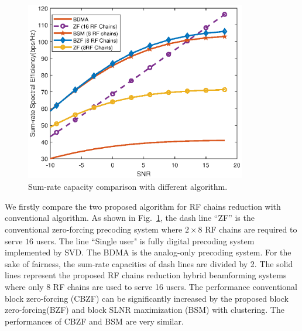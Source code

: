 \documentclass[conference]{IEEEtran}
\begin{document}
{\begin{figure}[ht]
	\begin{center}
		\includegraphics[width=3.8in,height=3.1in]{Figure/comp1path.eps}
		\caption{Sum-rate capacity comparison with different algorithm.}\label{fig:MultiuserGain}
	\end{center}
\end{figure}


We firstly compare the two proposed algorithm for RF chains reduction with conventional algorithm. As shown in Fig.~\ref{fig:MultiuserGain}, the dash line ``ZF'' is the conventional zero-forcing precoding system where $2\times 8$ RF chains are required to serve $16$ users. The line ``Single user" is fully digital precoding system implemented by SVD. The BDMA is the analog-only precoding system. For the sake of fairness, the sum-rate capacities of dash lines are divided by 2. The solid lines represent the proposed RF chains reduction hybrid beamforming systems where only 8 RF chains are used to serve 16 users. The performance conventional block zero-forcing (CBZF) can be significantly increased by the proposed block zero-forcing(BZF) and block SLNR maximization (BSM) with clustering. The performances of CBZF and BSM are very similar.


}
\end{document}
